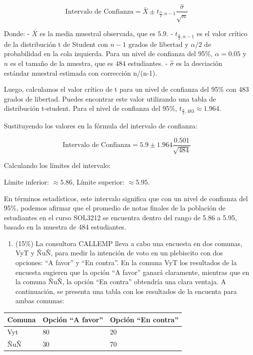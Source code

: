 \documentclass[
  letterpaper,
  DIV=11,
  numbers=noendperiod]{scrartcl}
\providecommand{\tightlist}{%
  \setlength{\itemsep}{0pt}\setlength{\parskip}{0pt}}\usepackage{longtable,booktabs,array}
\begin{document}
\[\text{Intervalo de Confianza} = \bar{X} \pm t_{\frac{\alpha}{2}, n-1} \frac{\hat{\sigma}}{\sqrt{n}}\]

Donde: - \(\bar{X}\) es la media muestral observada, que es \(5.9\). -
\(t_{\frac{\alpha}{2}, n-1}\) es el valor crítico de la distribución t
de Student con \(n-1\) grados de libertad y \(\alpha/2\) de probabilidad
en la cola izquierda. Para un nivel de confianza del 95\%,
\(\alpha = 0.05\) y \(n\) es el tamaño de la muestra, que es \(484\)
estudiantes. - \(\hat{\sigma}\) es la desviación estándar muestral
estimada con corrección n/(n-1).

Luego, calculamos el valor crítico de t para un nivel de confianza del
95\% con 483 grados de libertad. Puedes encontrar este valor utilizando
una tabla de distribución t-student. Para el nivel de confianza del
95\%, \(t_{\frac{\alpha}{2}, 483} \approx 1.964\).

Sustituyendo los valores en la fórmula del intervalo de confianza:

\[\text{Intervalo de Confianza} = 5.9 \pm 1.964 \frac{0.501}{\sqrt{484}}\]

Calculando los límites del intervalo:

Límite inferior: \(\approx 5.86\), Límite superior: \(\approx 5.95\).

En términos estadísticos, este intervalo significa que con un nivel de
confianza del 95\%, podemos afirmar que el promedio de notas finales de
la población de estudiantes en el curso SOL3212 se encuentra dentro del
rango de 5.86 a 5.95, basado en la muestra de 484 estudiantes.

\begin{enumerate}
\def\labelenumi{\arabic{enumi}.}
\setcounter{enumi}{5}
\tightlist
\item
  (15\%) La consultora CALLEMP lleva a cabo una encuesta en dos comunas,
  VyT y ÑuÑ, para medir la intención de voto en un plebiscito con dos
  opciones: ``A favor'' y ``En contra''. En la comuna VyT los resultados
  de la encuesta sugieren que la opción ``A favor'' ganará claramente,
  mientras que en la comuna ÑuÑ, la opción ``En contra'' obtendría una
  clara ventaja. A continuación, se presenta una tabla con los
  resultados de la encuenta para ambas comunas:
\end{enumerate}

\begin{longtable}[]{@{}lll@{}}
\toprule\noalign{}
Comuna & Opción ``A favor'' & Opción ``En contra'' \\
\midrule\noalign{}
\endhead
\bottomrule\noalign{}
\endlastfoot
Vyt & 80 & 20 \\
ÑuÑ & 30 & 70 \\
\end{longtable}
\end{document}
